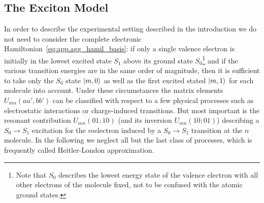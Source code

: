 \subsection{The Exciton Model}
\label{sub:app.model.exciton}
%

In order to describe the experimental setting described in the introduction we do not need to consider the complete electronic Hamiltonian~\ref{eq:app.agg_hamil_basis}:
if only a single valence electron is initially in the lowest excited state $S_1$ above its ground state $S_0$\footnote{%
  Note that $S_0$ describes the lowest energy state of the valence electron with all other electrons of the molecule fixed, not to be confused with the atomic ground states.
}
and if the various transition energies are in the same order of magnitude, then it is sufficient to take only the $S_0$ state $| m, 0 \rangle$ as well as the first excited stated $| m, 1 \rangle$ for each molecule into account.
Under these circumstances the matrix elements $U_{mn}(aa', bb')$ can be classified with respect to a few physical processes such as electrostatic interactions or charge-induced transitions.
But most important is the resonant contribution $U_{mn}(01; 10)$ (and its inversion $U_{mn}(10; 01)$) describing a $S_0 \to S_1$ excitation for the $m$\th electron induced by a  $S_0 \to S_1$ transition at the $n$\th molecule.
In the following we neglect all but the last class of processes, which is frequently called Heitler-London approximation.

